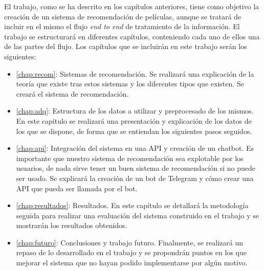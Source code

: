 El trabajo, como se ha descrito en los capítulos anteriores, tiene como objetivo la creación de un sistema de recomendación de películas, aunque se tratará de incluir en el mismo el flujo \textit{end to end} de tratamiento de la información. El trabajo se estructurará en diferentes capítulos, conteniendo cada uno de ellos una de las partes del flujo. Los capítulos que se incluirán en este trabajo serán los siguientes:

\begin{itemize}
    \item \autoref{chap:recom}: Sistemas de recomendación. Se realizará una explicación de la teoría que existe tras estos sistemas y los diferentes tipos que existen. Se creará el sistema de recomendación.
    \item \autoref{chap:adq}: Estructura de los datos a utilizar y preprocesado de los mismos. En este capítulo se realizará una presentación y explicación de los datos de los que se dispone, de forma que se entiendan los siguientes pasos seguidos.
    
    \item \autoref{chap:api}: Integración del sistema en una API y creación de un chatbot. Es importante que nuestro sistema de recomendación sea explotable por los usuarios, de nada sirve tener un buen sistema de recomendación si no puede ser usado. Se explicará la creación de un bot de Telegram y cómo crear una API que pueda ser llamada por el bot.
    \item \autoref{chap:resultados}: Resultados. En este capítulo se detallará la metodología seguida para realizar una evaluación del sistema construido en el trabajo y se mostrarán los resultados obtenidos.
    \item \autoref{chap:futuro}: Conclusiones y trabajo futuro. Finalmente, se realizará un repaso de lo desarrollado en el trabajo y se propondrán puntos en los que mejorar el sistema que no hayan podido implementarse por algún motivo.
\end{itemize}

